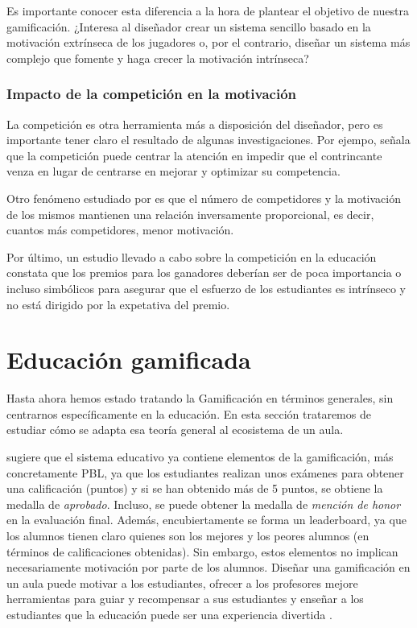 Es importante conocer esta diferencia a la hora de plantear el objetivo de nuestra gamificación. 
%
¿Interesa al diseñador crear un sistema sencillo basado en la motivación extrínseca de los jugadores o, por el contrario, diseñar un sistema más complejo que fomente y haga crecer la motivación intrínseca?



\subsubsection{Impacto de la competición en la motivación}

\label{PosiblesPeligros}
%
La competición es otra herramienta más a disposición del diseñador, pero es importante tener claro el resultado de algunas investigaciones.
%
Por ejempo, \cite{Crawford_CompetitionDef} señala que la competición puede centrar la atención en impedir que el contrincante venza en lugar de centrarse en mejorar y optimizar su competencia.
%

Otro fenómeno estudiado por \cite{n-effect} es que el número de competidores y la motivación de los mismos mantienen una relación inversamente proporcional, es decir, cuantos más competidores, menor motivación.

Por último, un estudio llevado a cabo sobre la competición en la educación \cite{CompetitionInEd} constata que los premios para los ganadores deberían ser de poca importancia o incluso simbólicos para asegurar que el esfuerzo de los estudiantes es intrínseco y no está dirigido por la expetativa del premio.



\section{Educación gamificada}

Hasta ahora hemos estado tratando la Gamificación en términos generales, sin centrarnos específicamente en la educación. 
%
En esta sección trataremos de estudiar cómo se adapta esa teoría general al ecosistema de un aula.


\cite{lee2011gamification} sugiere que el sistema educativo ya contiene elementos de la gamificación, más concretamente \gls{PBL}, ya que los estudiantes realizan unos exámenes para obtener una calificación (puntos) y si se han obtenido más de 5 puntos, se obtiene la medalla de \textit{aprobado}.
%
Incluso, se puede obtener la medalla de \textit{mención de honor} en la evaluación final.
%
Además, encubiertamente se forma un leaderboard, ya que los alumnos tienen claro quienes son los mejores y los peores alumnos (en términos de calificaciones obtenidas).
%
Sin embargo, estos elementos no implican necesariamente motivación por parte de los alumnos.
%
Diseñar una gamificación en un aula puede motivar a los estudiantes, ofrecer a los profesores mejore herramientas para guiar y recompensar a sus estudiantes y enseñar a los estudiantes que la educación puede ser una experiencia divertida \cite{lee2011gamification}.

